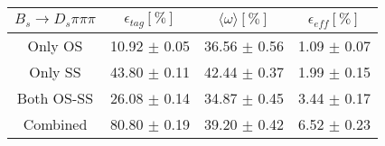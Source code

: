 \begin{tabular}{c c c c}
\hline
\hline
$ B_s \to D_s \pi \pi \pi$ & $\epsilon_{tag} [\%]$ & $\langle \omega \rangle [\%] $ & $\epsilon_{eff} [\%]$ \\
\hline
Only OS & 10.92 $\pm$ 0.05 & 36.56 $\pm$ 0.56 & 1.09 $\pm$ 0.07\\
Only SS & 43.80 $\pm$ 0.11 & 42.44 $\pm$ 0.37 & 1.99 $\pm$ 0.15\\
Both OS-SS & 26.08 $\pm$ 0.14 & 34.87 $\pm$ 0.45 & 3.44 $\pm$ 0.17\\
\hline
Combined & 80.80 $\pm$ 0.19 & 39.20 $\pm$ 0.42 & 6.52 $\pm$ 0.23\\
\hline
\hline
\end{tabular}
